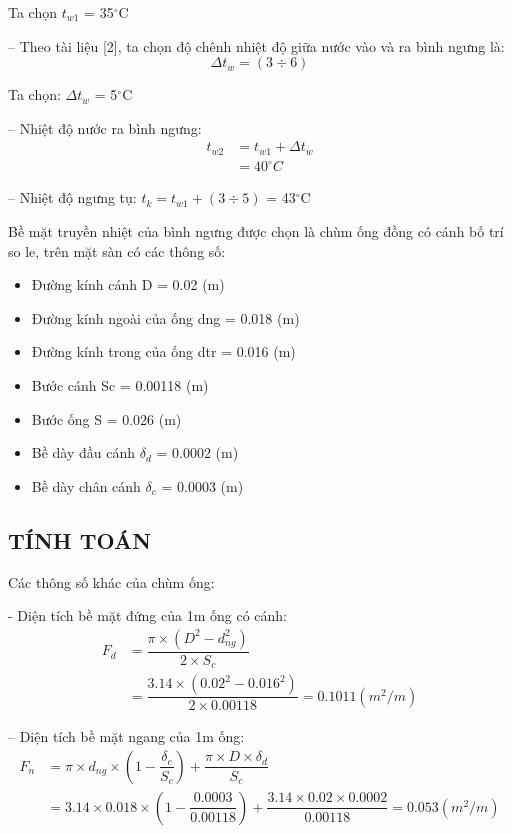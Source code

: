 Ta chọn $t_{w1}$ = 35$^{\circ}$C

-- Theo tài liệu [2], ta chọn độ chênh nhiệt độ giữa nước vào và ra bình ngưng là: 
\begin{equation*}
	\Delta t_{w} = (3\div 6)
\end{equation*}

Ta chọn: $\Delta t_{w}$ = 5$^{\circ}$C

-- Nhiệt độ nước ra bình ngưng:
\begin{equation*}
	\begin{split}
		 t_{w2} &= t_{w1} + \Delta t_{w} \\
		 &= 40^{\circ}C
	\end{split}
\end{equation*}

-- Nhiệt độ ngưng tụ: $t_{k} = t_{w1} + (3\div 5)$ =  43$^{\circ}$C

Bề mặt truyền nhiệt của bình ngưng được chọn là chùm ống đồng có cánh bố trí so le, trên mặt sàn có các thông số:
\begin{itemize}
	\item Đường kính cánh D = 0.02 (m)
	\item Đường kính ngoài của ống d{\scriptsize ng} = 0.018 (m)
	\item Đường kính trong của ống d{\scriptsize tr} = 0.016 (m)
	\item Bước cánh S{\scriptsize c} = 0.00118 (m)
	\item Bước ống S = 0.026 (m)
	\item Bề dày đầu cánh $\delta_{d}$ = 0.0002 (m)
	\item Bề dày chân cánh $\delta_{c}$ = 0.0003 (m)
\end{itemize}

\subsection{TÍNH TOÁN}
Các thông số khác của chùm ống:

- Diện tích bề mặt đứng của 1m ống có cánh:
\begin{equation*}
	\begin{split}
		F_{d} &= \dfrac{\pi\times (D^2 - d^2_{ng})}{2\times S_{c}}\\
		&=\dfrac{3.14 \times (0.02^2 - 0.016^2)}{2 \times 0.00118} = 0.1011(m^2/m)
	\end{split}
\end{equation*}

-- Diện tích bề mặt ngang của 1m ống:
\begin{equation*}
\begin{split}
		F_{n} &= \pi\times d_{ng}\times \left(1-\dfrac{\delta_{c}}{S_{c}}\right) + \dfrac{\pi\times D\times \delta_{d}}{S_{c}}\\
		&= 3.14 \times 0.018 \times (1-\dfrac{0.0003}{0.00118}) + \dfrac{3.14 \times 0.02 \times 0.0002}{0.00118} = 0.053 (m^2/m)
\end{split}
\end{equation*}

